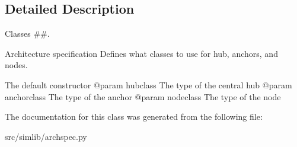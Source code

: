 \subsection{Detailed Description}
Classes \#\#. 

\begin{DoxyVerb}Architecture specification
Defines what classes to use for hub, anchors, and nodes.
\end{DoxyVerb}
 \begin{DoxyVerb}The default constructor
@param hubclass The type of the central hub
@param anchorclass The type of the anchor
@param nodeclass The type of the node
\end{DoxyVerb}
 

The documentation for this class was generated from the following file\+:\begin{DoxyCompactItemize}
\item 
src/simlib/archspec.\+py\end{DoxyCompactItemize}
